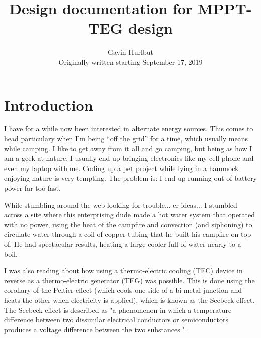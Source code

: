 \documentclass{report}
\begin{document}
\title {Design documentation for MPPT-TEG design}
\author {Gavin Hurlbut \\ Originally written starting September 17, 2019}
\maketitle
\tableofcontents
\eject
\listoffigures
\listoftables
\eject

\setcounter{chapter}{0}
\renewcommand\chaptername{\space}
\renewcommand\thechapter{}

\chapter{Introduction}
I have for a while now been interested in alternate energy sources.  This 
comes to head particulary when I'm being ``off the grid'' for a time, which
usually means while camping.  I like to get away from it all and go camping, but
being as how I am a geek at nature, I usually end up bringing electronics like
my cell phone and even my laptop with me.  Coding up a pet project while lying
in a hammock enjoying nature is very tempting.  The problem is:  I end up
running out of battery power far too fast.

While stumbling around the web looking for trouble... er ideas... I stumbled
across a site where this enterprising dude made a hot water system that
operated with no power, using the heat of the campfire and convection (and 
siphoning) to circulate water through a coil of copper tubing that he built
his campfire on top of.  He had spectacular results, heating a large cooler 
full of water nearly to a boil.

I was also reading about how using a thermo-electric cooling (TEC) device in
reverse as a thermo-electric generator (TEG) was possible.  This is done using
the corollary of the Peltier effect (which cools one side of a bi-metal 
junction and heats the other when electricity is applied), which is known as 
the Seebeck effect.  The Seebeck effect is described as "a phenomenon in which
a temperature difference between two dissimilar electrical conductors or
semiconductors produces a voltage difference between the two substances." \cite{WI}.
\end{document}
